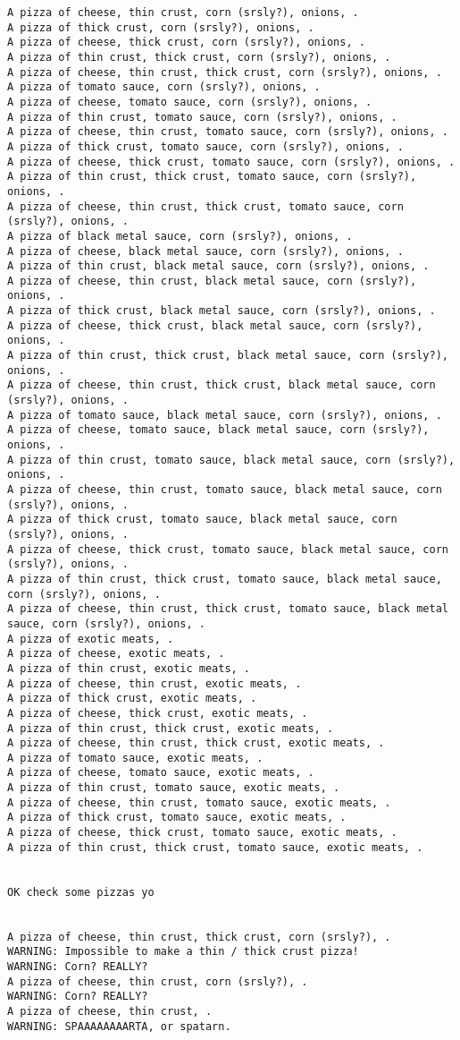 \documentclass[11pt]{article}
\begin{document}
\begin{enumerate}
\begin{verbatim}
A pizza of cheese, thin crust, corn (srsly?), onions, .
A pizza of thick crust, corn (srsly?), onions, .
A pizza of cheese, thick crust, corn (srsly?), onions, .
A pizza of thin crust, thick crust, corn (srsly?), onions, .
A pizza of cheese, thin crust, thick crust, corn (srsly?), onions, .
A pizza of tomato sauce, corn (srsly?), onions, .
A pizza of cheese, tomato sauce, corn (srsly?), onions, .
A pizza of thin crust, tomato sauce, corn (srsly?), onions, .
A pizza of cheese, thin crust, tomato sauce, corn (srsly?), onions, .
A pizza of thick crust, tomato sauce, corn (srsly?), onions, .
A pizza of cheese, thick crust, tomato sauce, corn (srsly?), onions, .
A pizza of thin crust, thick crust, tomato sauce, corn (srsly?), onions, .
A pizza of cheese, thin crust, thick crust, tomato sauce, corn (srsly?), onions, .
A pizza of black metal sauce, corn (srsly?), onions, .
A pizza of cheese, black metal sauce, corn (srsly?), onions, .
A pizza of thin crust, black metal sauce, corn (srsly?), onions, .
A pizza of cheese, thin crust, black metal sauce, corn (srsly?), onions, .
A pizza of thick crust, black metal sauce, corn (srsly?), onions, .
A pizza of cheese, thick crust, black metal sauce, corn (srsly?), onions, .
A pizza of thin crust, thick crust, black metal sauce, corn (srsly?), onions, .
A pizza of cheese, thin crust, thick crust, black metal sauce, corn (srsly?), onions, .
A pizza of tomato sauce, black metal sauce, corn (srsly?), onions, .
A pizza of cheese, tomato sauce, black metal sauce, corn (srsly?), onions, .
A pizza of thin crust, tomato sauce, black metal sauce, corn (srsly?), onions, .
A pizza of cheese, thin crust, tomato sauce, black metal sauce, corn (srsly?), onions, .
A pizza of thick crust, tomato sauce, black metal sauce, corn (srsly?), onions, .
A pizza of cheese, thick crust, tomato sauce, black metal sauce, corn (srsly?), onions, .
A pizza of thin crust, thick crust, tomato sauce, black metal sauce, corn (srsly?), onions, .
A pizza of cheese, thin crust, thick crust, tomato sauce, black metal sauce, corn (srsly?), onions, .
A pizza of exotic meats, .
A pizza of cheese, exotic meats, .
A pizza of thin crust, exotic meats, .
A pizza of cheese, thin crust, exotic meats, .
A pizza of thick crust, exotic meats, .
A pizza of cheese, thick crust, exotic meats, .
A pizza of thin crust, thick crust, exotic meats, .
A pizza of cheese, thin crust, thick crust, exotic meats, .
A pizza of tomato sauce, exotic meats, .
A pizza of cheese, tomato sauce, exotic meats, .
A pizza of thin crust, tomato sauce, exotic meats, .
A pizza of cheese, thin crust, tomato sauce, exotic meats, .
A pizza of thick crust, tomato sauce, exotic meats, .
A pizza of cheese, thick crust, tomato sauce, exotic meats, .
A pizza of thin crust, thick crust, tomato sauce, exotic meats, .


OK check some pizzas yo


A pizza of cheese, thin crust, thick crust, corn (srsly?), .
WARNING: Impossible to make a thin / thick crust pizza!
WARNING: Corn? REALLY?
A pizza of cheese, thin crust, corn (srsly?), .
WARNING: Corn? REALLY?
A pizza of cheese, thin crust, .
WARNING: SPAAAAAAAARTA, or spatarn.
\end{verbatim}
\end{enumerate}
\end{document}
